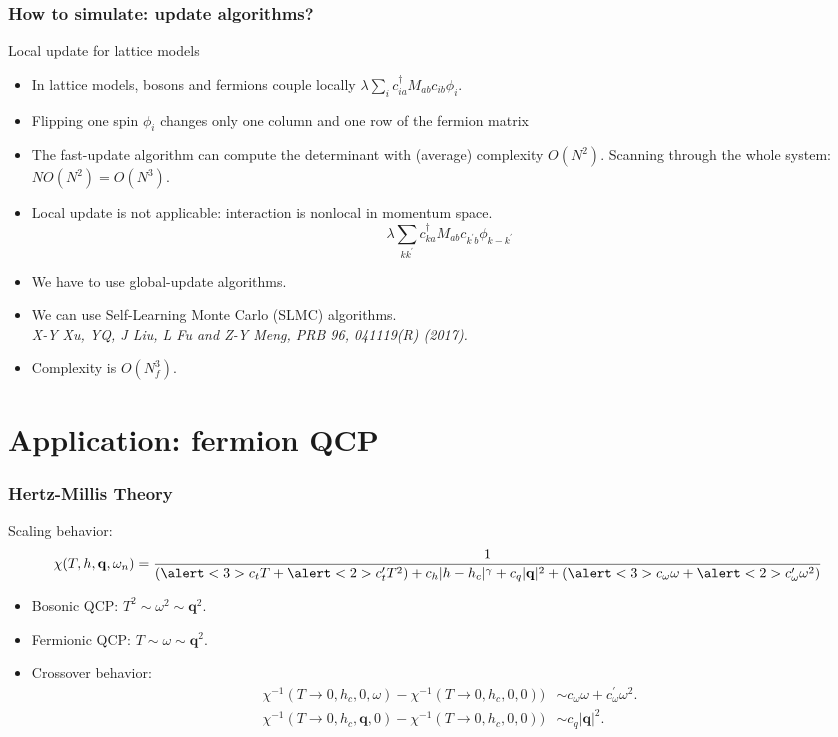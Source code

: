 \documentclass[xcolor=table, 10pt, aspectratio=43]{beamer}
\begin{document}
\begin{frame}
  \frametitle{How to simulate: update algorithms?}
  \begin{block}{Local update for lattice models}
    \begin{itemize}
      \item In lattice models, bosons and fermions couple locally $\lambda\sum_ic_{ia}^\dagger M_{ab}c_{ib}\phi_i$.
      \item Flipping one spin $\phi_i$ changes only one column and one row of the fermion matrix
      \item The fast-update algorithm can compute the determinant with (average) complexity $O(N^2)$. Scanning through the whole system: $NO(N^2)=O(N^3)$.
    \end{itemize}
  \end{block}
  \begin{itemize}
    \item Local update is not applicable: interaction is nonlocal in momentum space.
    \[\lambda\sum_{kk^\prime}c_{ka}^\dagger M_{ab}c_{k^\prime b}\phi_{k-k^\prime}\]
    \item We have to use global-update algorithms.
    \item We can use Self-Learning Monte Carlo (SLMC) algorithms.\\
    \emph{\small X-Y Xu, YQ, J Liu, L Fu and Z-Y Meng, PRB 96, 041119(R) (2017).}
    \item Complexity is $O(N_f^3)$.
  \end{itemize}
\end{frame}

\section{Application: fermion QCP}

\begin{frame}
  \frametitle{Hertz-Millis Theory}
  Scaling behavior:
\[\chi(T,h,\mathbf{q},\omega_n)=
\frac{1}{(\alert<3>{c_{t}T}+\alert<2>{c_{t}' T^{2}})
+c_{h}|h-h_c|^{\gamma}+c_q|\mathbf{q}|^2
+ (\alert<3>{c_{\omega}\omega}+\alert<2>{c'_{\omega}\omega^{2}})}\]
\begin{itemize}
  \item<2-> Bosonic QCP: $T^2\sim\omega^2\sim \bm q^2$.
  \item<3-> Fermionic QCP: $T\sim\omega\sim \bm q^2$.
  \item<4-> Crossover behavior:
  \begin{align*}
    \chi^{-1}(T\rightarrow0,h_c,0,\omega)-\chi^{-1}(T\rightarrow0,h_c,0,0))
    &\sim c_\omega\omega + c_\omega^\prime\omega^2.\\
    \chi^{-1}(T\rightarrow0,h_c,\bm q,0)-\chi^{-1}(T\rightarrow0,h_c,0,0))
    &\sim c_q|\bm q|^2.
  \end{align*}
\end{itemize}
\end{frame}
\end{document}
